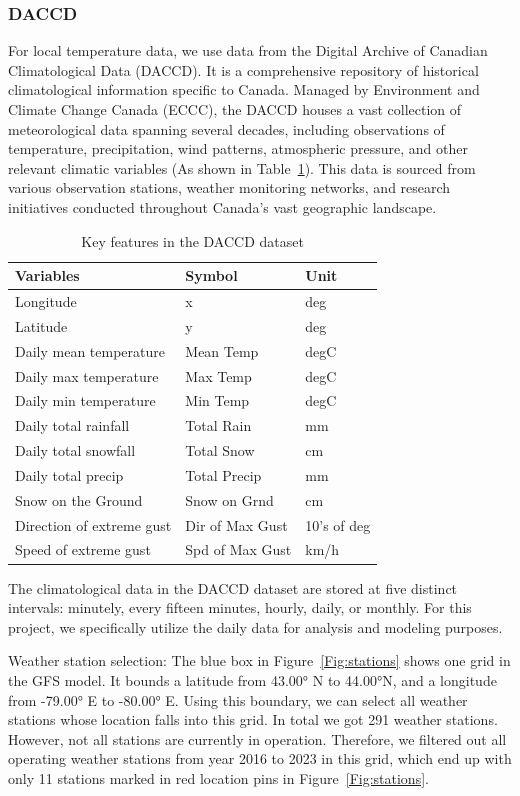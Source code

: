 \documentclass[12pt]{article}
\begin{document}
\subsubsection{DACCD}

For local temperature data, we use data from the Digital Archive of Canadian Climatological Data (DACCD). It is a comprehensive repository of historical climatological information specific to Canada. Managed by Environment and Climate Change Canada (ECCC), the DACCD houses a vast collection of meteorological data spanning several decades, including observations of temperature, precipitation, wind patterns, atmospheric pressure, and other relevant climatic variables (As shown in Table~\ref{tab:DACCD}). This data is sourced from various observation stations, weather monitoring networks, and research initiatives conducted throughout Canada's vast geographic landscape.

\begin{table}[htpb]
	\centering
	\caption{Key features in the DACCD dataset}
	\label{tab:DACCD}
	\begin{tabular}{lll}
		\hline
	 Variables & Symbol & Unit\\
		\hline
	Longitude & x & deg\\
	Latitude & y & deg\\
	Daily mean temperature & Mean Temp & degC\\
	Daily max temperature & Max Temp & degC\\
	Daily min temperature & Min Temp & degC\\
	Daily total rainfall & Total Rain & mm\\
	Daily total snowfall & Total Snow & cm\\
	Daily total precip & Total Precip & mm\\
	Snow on the Ground& Snow on Grnd & cm\\
	Direction of extreme gust & Dir of Max Gust & 10's of deg\\
	Speed of extreme gust & Spd of Max Gust & km/h\\
	\hline
	\end{tabular}
\end{table}

The climatological data in the DACCD dataset are stored at five distinct intervals: minutely, every fifteen minutes, hourly, daily, or monthly. For this project, we specifically utilize the daily data for analysis and modeling purposes.


Weather station selection: The blue box in Figure~\ref{Fig:stations} shows one grid in the GFS model. It bounds a latitude from \ang{43.00} N to \ang{44.00}N, and a longitude from \ang{-79.00} E to \ang{-80.00} E. Using this boundary, we can select all weather stations whose location falls into this grid. In total we got 291 weather stations. However, not all stations are currently in operation. Therefore, we filtered out all operating weather stations from year 2016 to 2023 in this grid, which end up with only 11 stations marked in red location pins in Figure~\ref{Fig:stations}.
\end{document}
